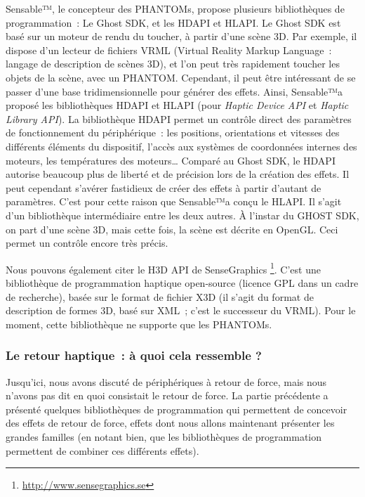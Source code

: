 \documentclass[
]{book}
\begin{document}
Sensable™, le concepteur des PHANTOMs, propose plusieurs bibliothèques de
programmation~: Le Ghost SDK, et les HDAPI et HLAPI. Le Ghost SDK est basé
sur un moteur de rendu du toucher, à partir d'une scène 3D. Par exemple, il
dispose d'un lecteur de fichiers VRML (Virtual Reality Markup Language~:
langage de description de scènes 3D), et l'on peut très rapidement toucher
les objets de la scène, avec un PHANTOM. Cependant, il peut être intéressant
de se passer d'une base tridimensionnelle pour générer des effets. Ainsi,
Sensable™a proposé les bibliothèques HDAPI et HLAPI (pour \emph{Haptic Device
API} et \emph{Haptic Library API}). La bibliothèque HDAPI permet un
contrôle direct des paramètres de fonctionnement du périphérique~: les
positions, orientations et vitesses des différents éléments du dispositif,
l'accès aux systèmes de coordonnées internes des moteurs, les températures
des moteurs\ldots{} Comparé au Ghost SDK, le HDAPI autorise beaucoup plus de
liberté et de précision lors de la création des effets. Il peut cependant
s'avérer fastidieux de créer des effets à partir d'autant de paramètres.
C'est pour cette raison que Sensable™a conçu le HLAPI. Il s'agit d'un
bibliothèque intermédiaire entre les deux autres. À l'instar du GHOST SDK, on
part d'une scène 3D, mais cette fois, la scène est décrite en OpenGL. Ceci
permet un contrôle encore très précis.

Nous pouvons également citer le H3D API de SenseGraphics \footnote{\url{http://www.sensegraphics.se}}.
C'est une bibliothèque de programmation haptique open-source (licence GPL
dans un cadre de recherche), basée sur le format de fichier X3D (il s'agit du
format de description de formes 3D, basé sur XML~; c'est le successeur du
VRML). Pour le moment, cette bibliothèque ne supporte que les PHANTOMs.

\hypertarget{le-retour-haptique-uxe0-quoi-cela-ressemble}{%
\subsubsection{Le retour haptique~: à quoi cela ressemble ?}\label{le-retour-haptique-uxe0-quoi-cela-ressemble}}

Jusqu'ici, nous avons discuté de périphériques à retour de force, mais
nous n'avons pas dit en quoi consistait le retour de force. La partie
précédente a présenté quelques bibliothèques de programmation qui permettent
de concevoir des effets de retour de force, effets dont nous allons
maintenant présenter les grandes familles (en notant bien, que les
bibliothèques de programmation permettent de combiner ces différents
effets).
\end{document}
